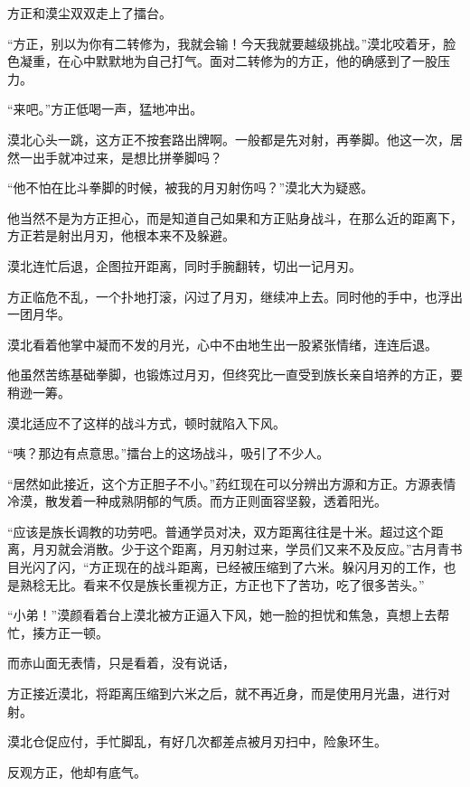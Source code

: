 
\begin{this_body}

方正和漠尘双双走上了擂台。

“方正，别以为你有二转修为，我就会输！今天我就要越级挑战。”漠北咬着牙，脸色凝重，在心中默默地为自己打气。面对二转修为的方正，他的确感到了一股压力。

“来吧。”方正低喝一声，猛地冲出。

漠北心头一跳，这方正不按套路出牌啊。一般都是先对射，再拳脚。他这一次，居然一出手就冲过来，是想比拼拳脚吗？

“他不怕在比斗拳脚的时候，被我的月刃射伤吗？”漠北大为疑惑。

他当然不是为方正担心，而是知道自己如果和方正贴身战斗，在那么近的距离下，方正若是射出月刃，他根本来不及躲避。

漠北连忙后退，企图拉开距离，同时手腕翻转，切出一记月刃。

方正临危不乱，一个扑地打滚，闪过了月刃，继续冲上去。同时他的手中，也浮出一团月华。

漠北看着他掌中凝而不发的月光，心中不由地生出一股紧张情绪，连连后退。

他虽然苦练基础拳脚，也锻炼过月刃，但终究比一直受到族长亲自培养的方正，要稍逊一筹。

漠北适应不了这样的战斗方式，顿时就陷入下风。

“咦？那边有点意思。”擂台上的这场战斗，吸引了不少人。

“居然如此接近，这个方正胆子不小。”药红现在可以分辨出方源和方正。方源表情冷漠，散发着一种成熟阴郁的气质。而方正则面容坚毅，透着阳光。

“应该是族长调教的功劳吧。普通学员对决，双方距离往往是十米。超过这个距离，月刃就会消散。少于这个距离，月刃射过来，学员们又来不及反应。”古月青书目光闪了闪，“方正现在的战斗距离，已经被压缩到了六米。躲闪月刃的工作，也是熟稔无比。看来不仅是族长重视方正，方正也下了苦功，吃了很多苦头。”

“小弟！”漠颜看着台上漠北被方正逼入下风，她一脸的担忧和焦急，真想上去帮忙，揍方正一顿。

而赤山面无表情，只是看着，没有说话，

方正接近漠北，将距离压缩到六米之后，就不再近身，而是使用月光蛊，进行对射。

漠北仓促应付，手忙脚乱，有好几次都差点被月刃扫中，险象环生。

反观方正，他却有底气。


\end{this_body}

